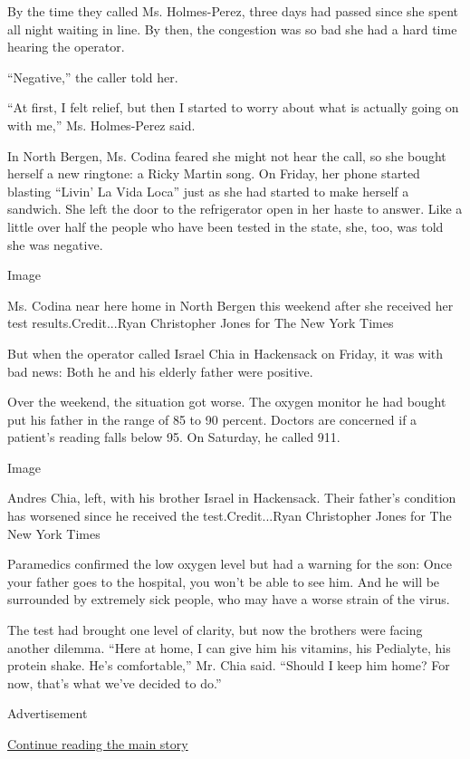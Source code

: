 By the time they called Ms. Holmes-Perez, three days had passed since
she spent all night waiting in line. By then, the congestion was so bad
she had a hard time hearing the operator.

``Negative,'' the caller told her.

``At first, I felt relief, but then I started to worry about what is
actually going on with me,'' Ms. Holmes-Perez said.

In North Bergen, Ms. Codina feared she might not hear the call, so she
bought herself a new ringtone: a Ricky Martin song. On Friday, her phone
started blasting ``Livin' La Vida Loca'' just as she had started to make
herself a sandwich. She left the door to the refrigerator open in her
haste to answer. Like a little over half the people who have been tested
in the state, she, too, was told she was negative.

Image

Ms. Codina near here home in North Bergen this weekend after she
received her test results.Credit...Ryan Christopher Jones for The New
York Times

But when the operator called Israel Chia in Hackensack on Friday, it was
with bad news: Both he and his elderly father were positive.

Over the weekend, the situation got worse. The oxygen monitor he had
bought put his father in the range of 85 to 90 percent. Doctors are
concerned if a patient's reading falls below 95. On Saturday, he called
911.

Image

Andres Chia, left, with his brother Israel in Hackensack. Their father's
condition has worsened since he received the test.Credit...Ryan
Christopher Jones for The New York Times

Paramedics confirmed the low oxygen level but had a warning for the son:
Once your father goes to the hospital, you won't be able to see him. And
he will be surrounded by extremely sick people, who may have a worse
strain of the virus.

The test had brought one level of clarity, but now the brothers were
facing another dilemma. ``Here at home, I can give him his vitamins, his
Pedialyte, his protein shake. He's comfortable,'' Mr. Chia said.
``Should I keep him home? For now, that's what we've decided to do.''

Advertisement

\protect\hyperlink{after-bottom}{Continue reading the main story}

